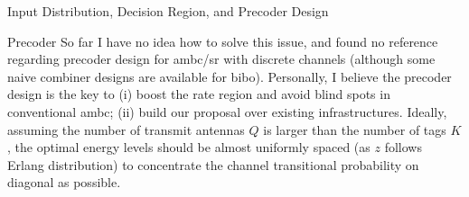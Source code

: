 \documentclass[journal]{IEEEtran}
\begin{document}
\begin{section}{Input Distribution, Decision Region, and Precoder Design}
\begin{subsection}{Precoder}
			So far I have no idea how to solve this issue, and found no reference regarding precoder design for \gls{ambc}/\gls{sr} with discrete channels (although some naive combiner designs are available for \gls{bibo}). Personally, I believe the precoder design is the key to (i) boost the rate region and avoid blind spots in conventional \gls{ambc}; (ii) build our proposal over existing infrastructures. Ideally, assuming the number of transmit antennas $Q$ is larger than the number of tags $K$, the optimal energy levels should be almost uniformly spaced (as $z$ follows Erlang distribution) to concentrate the channel transitional probability on diagonal as possible.
		\end{subsection}
	\end{section}

\end{document}
